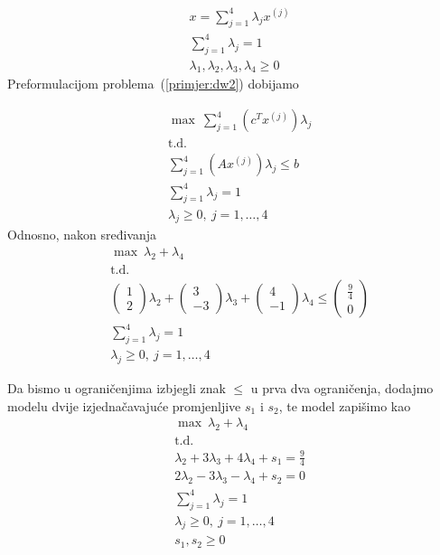 \documentclass[b5paper, utf8, 11pt, colorlinks]{book}
\theoremstyle{definition}
\begin{document}
$$\begin{aligned}
&x = \sum_{j=1}^4\lambda_j x^{(j)}\\
&\sum_{j=1}^4\lambda_j=1\\
&\lambda_1,\lambda_2,\lambda_3,\lambda_4\geqslant 0
\end{aligned}$$
 Preformulacijom problema~(\ref{primjer:dw2}) dobijamo
 
     \begin{equation}
 	\begin{aligned}\label{primjer:dw3}
 		&\max\   \sum_{j=1}^4(c^T  x^{(j)})\lambda_j\\
 		&\mbox{t.d.}\\ 
 		 &\sum_{j=1}^4 (A  x^{(j)})\lambda_j\leqslant b\\
 		&\sum_{j=1}^4\lambda_j = 1\\
 		&\lambda_j\geqslant 0,\ j = 1,\ldots,4
 	\end{aligned}
 \end{equation}
 Odnosno, nakon sređivanja 
      \begin{equation}
 	\begin{aligned}\label{primjer:dw4}
 		&\max \  \lambda_2+\lambda_4\\
 		&\mbox{t.d.}\\
 		 &\left(\begin{array}{c}
 			1\\
 			2
 		\end{array}\right)\lambda_2+\left(\begin{array}{c}
 		3\\
 		-3
 	\end{array}\right)\lambda_3+\left(\begin{array}{c}
 	4\\
 	-1
 \end{array}\right)\lambda_4\leqslant \left(\begin{array}{c}
 			\frac 9 4\\
 			0
 		\end{array}\right)\\
 		&\sum_{j=1}^4\lambda_j = 1\\
 		&\lambda_j\geqslant 0,\ j = 1,\ldots,4
 	\end{aligned}
 \end{equation}

Da bismo u ograničenjima izbjegli znak $\leqslant$ u prva dva ograničenja, dodajmo modelu dvije izjednačavajuće promjenljive $s_1$ i $s_2$, te model zapišimo kao
      \begin{equation}
	\begin{aligned}\label{primjer:dw5}
		&\max\   \lambda_2+\lambda_4\\
		&\mbox{t.d.}\\
		  &\lambda_2+3\lambda_3+4\lambda_4+s_1=\frac 94\\
		&2\lambda_2-3\lambda_3-\lambda_4+s_2=0\\
		&\sum_{j=1}^4\lambda_j = 1\\
		&\lambda_j\geqslant 0,\ j = 1,\ldots,4\\
		&s_1,s_2\geqslant 0
	\end{aligned}
\end{equation}
\end{document}
